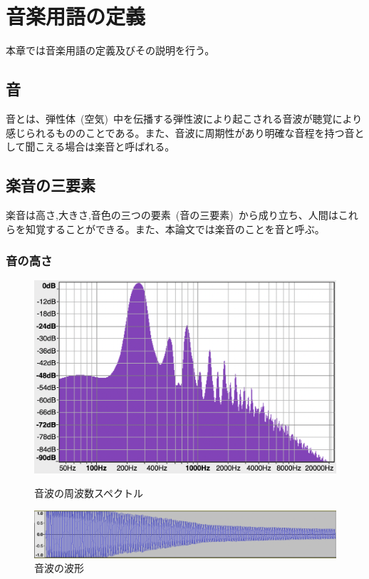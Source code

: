 \chapter{音楽用語の定義}

本章では音楽用語の定義及びその説明を行う。

\section{音}

音とは、弾性体~(空気)~中を伝播する弾性波により起こされる音波が聴覚により感じられるもののことである。また、音波に周期性があり明確な音程を持つ音として聞こえる場合は楽音と呼ばれる。

\section{楽音の三要素}

楽音は高さ,大きさ,音色の三つの要素~(音の三要素)~から成り立ち、人間はこれらを知覚することができる。また、本論文では楽音のことを音と呼ぶ。

\subsection{音の高さ}

\begin{figure}[ht]
\begin{center}
\begin{minipage}{0.48\hsize}
\begin{center}
\includegraphics[width=0.95\hsize]{figure/c4_harp_spectrum.png}
\caption{音波の周波数スペクトル}
\label{fig:spectrum}
\end{center}
\end{minipage}
\begin{minipage}{0.48\hsize}
\begin{center}
\includegraphics[width=0.95\hsize]{figure/c4_harp_wav.png}
\caption{音波の波形}
\label{fig:wav}
\end{center}
\end{minipage}
\end{center}
\end{figure}

